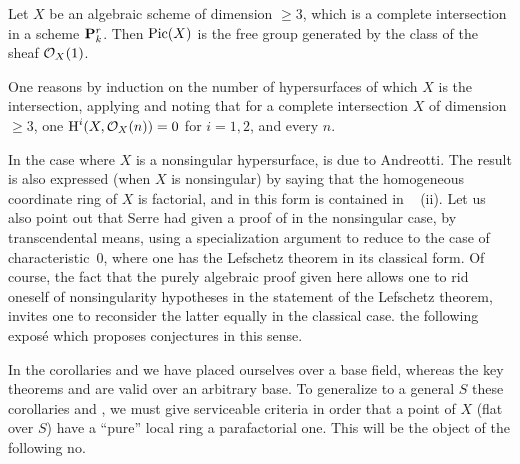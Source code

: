 \begin{corollary} \label{XII.3.7} Let $X$ be an algebraic scheme of dimension $\geq 3$, which is a complete intersection in a scheme ${\mathbf P}_k^r$. Then $\operatorname{Pic}(X)$ is the free group generated by the class of the sheaf $\mathcal{O}_X(1)$.
\end{corollary}
One reasons by induction on the number of hypersurfaces of which $X$ is the intersection, applying  and noting that for a complete intersection $X$ of dimension $\geq 3$, one $\operatorname{H}^i(X, \mathcal{O}_X(n))=0$ for $i=1, 2$, and every $n$.

\begin{remark} \label{XII.3.8}
In the case where $X$ is a nonsingular hypersurface,  is due to Andreotti. The result  is also expressed (when $X$ is nonsingular) by saying that the homogeneous coordinate ring of $X$ is factorial, and in this form is contained in ~ (ii). Let us also point out that Serre had given a proof of  in the nonsingular case, by transcendental means, using a specialization argument to reduce to the case of characteristic~$0$, where one has the Lefschetz theorem in its classical form. Of course, the fact that the purely algebraic proof given here allows one to rid oneself of nonsingularity hypotheses in the statement of the Lefschetz theorem, invites one to reconsider the latter equally in the classical case. \Cf the following expos\'e which proposes conjectures in this sense.

In the corollaries  and  we have placed ourselves over a base field, whereas the key theorems  and  are valid over an arbitrary base. To generalize to a general $S$ these corollaries  and , we must give serviceable criteria in order that a point of $X$ (flat over $S$) have a ``pure'' local ring \resp a parafactorial one. This will be the object of the following no.
\end{remark}
